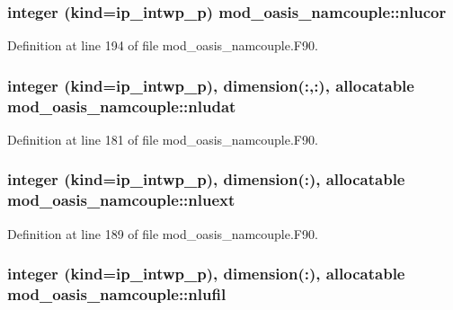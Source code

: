 \hypertarget{classmod__oasis__namcouple_aee9f6849ec644ee40f465976bc6c7b96}{
\subsubsection[{nlucor}]{\setlength{\rightskip}{0pt plus 5cm}integer (kind=ip\+\_\+intwp\+\_\+p) mod\+\_\+oasis\+\_\+namcouple\+::nlucor\hspace{0.3cm}{\ttfamily [private]}}}\label{classmod__oasis__namcouple_aee9f6849ec644ee40f465976bc6c7b96}


Definition at line 194 of file mod\+\_\+oasis\+\_\+namcouple.\+F90.

\hypertarget{classmod__oasis__namcouple_abb7c2cd3a371bbb8ccd6a272d0e9b60f}{
\subsubsection[{nludat}]{\setlength{\rightskip}{0pt plus 5cm}integer (kind=ip\+\_\+intwp\+\_\+p), dimension(\+:,\+:), allocatable mod\+\_\+oasis\+\_\+namcouple\+::nludat\hspace{0.3cm}{\ttfamily [private]}}}\label{classmod__oasis__namcouple_abb7c2cd3a371bbb8ccd6a272d0e9b60f}


Definition at line 181 of file mod\+\_\+oasis\+\_\+namcouple.\+F90.

\hypertarget{classmod__oasis__namcouple_a7510ecfe3d0f141252450e4ba66209ba}{
\subsubsection[{nluext}]{\setlength{\rightskip}{0pt plus 5cm}integer (kind=ip\+\_\+intwp\+\_\+p), dimension(\+:), allocatable mod\+\_\+oasis\+\_\+namcouple\+::nluext\hspace{0.3cm}{\ttfamily [private]}}}\label{classmod__oasis__namcouple_a7510ecfe3d0f141252450e4ba66209ba}


Definition at line 189 of file mod\+\_\+oasis\+\_\+namcouple.\+F90.

\hypertarget{classmod__oasis__namcouple_a31f62f64cbcf344e529d0576386d0751}{
\subsubsection[{nlufil}]{\setlength{\rightskip}{0pt plus 5cm}integer (kind=ip\+\_\+intwp\+\_\+p), dimension(\+:), allocatable mod\+\_\+oasis\+\_\+namcouple\+::nlufil\hspace{0.3cm}{\ttfamily [private]}}}\label{classmod__oasis__namcouple_a31f62f64cbcf344e529d0576386d0751}


